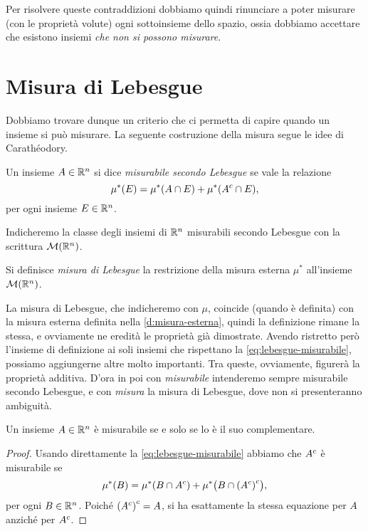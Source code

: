 Per risolvere queste contraddizioni dobbiamo quindi rinunciare a poter misurare (con le proprietà volute) ogni sottoinsieme dello spazio, ossia dobbiamo accettare che esistono insiemi \emph{che non si possono misurare}.

\section{Misura di Lebesgue}
\label{sec:misura-lebesgue}
Dobbiamo trovare dunque un criterio che ci permetta di capire quando un insieme si può misurare.
La seguente costruzione della misura segue le idee di Carath\'eodory.
\begin{definizione} \label{d:lebesgue-misurabile}
	Un insieme $A\in\mathbb{R}^n$ si dice \emph{misurabile secondo Lebesgue} se vale la relazione
	\begin{equation}
		\mu^*(E)=\mu^*(A\cap E)+\mu^*({A}^c\cap E),
		\label{eq:lebesgue-misurabile}
	\end{equation}
	per ogni insieme $E\in\mathbb{R}^n$.
\end{definizione}
Indicheremo la classe degli insiemi di $\mathbb{R}^n$ misurabili secondo Lebesgue con la scrittura $\mathcal M(\mathbb{R}^n)$.
\begin{definizione} \label{d:misura-lebesgue}
	Si definisce \emph{misura di Lebesgue} la restrizione della misura esterna $\mu^*$ all'insieme $\mathcal M(\mathbb{R}^n)$.
\end{definizione}
La misura di Lebesgue, che indicheremo con $\mu$, coincide (quando è definita) con la misura esterna definita nella \ref{d:misura-esterna}, quindi la definizione rimane la stessa, e ovviamente ne eredità le proprietà già dimostrate.
Avendo ristretto però l'insieme di definizione ai soli insiemi che rispettano la \eqref{eq:lebesgue-misurabile}, possiamo aggiungerne altre molto importanti.
Tra queste, ovviamente, figurerà la proprietà additiva.
D'ora in poi con \emph{misurabile} intenderemo sempre misurabile secondo Lebesgue, e con \emph{misura} la misura di Lebesgue, dove non si presenteranno ambiguità.
\begin{proprieta} \label{pr:complementare-misurabile}
	Un insieme $A\in\mathbb{R}^n$ è misurabile se e solo se lo è il suo complementare.
\end{proprieta}
\begin{proof}
	Usando direttamente la \eqref{eq:lebesgue-misurabile} abbiamo che ${A}^c$ è misurabile se
	\begin{equation}
		\mu^*(B)=\mu^*(B\cap{A}^c)+\mu^*\big(B\cap{({A}^c)}^c\big),
	\end{equation}
	per ogni $B\in\mathbb{R}^n$.
Poich\'e ${({A}^c)}^c=A$, si ha esattamente la stessa equazione per $A$ anzich\'e per ${A}^c$.
\end{proof}
